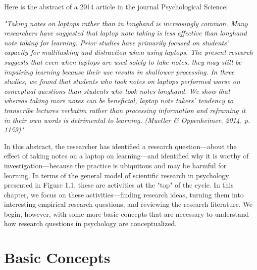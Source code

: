

Here is the abstract of a 2014 article in the journal Psychological Science:

\emph{"Taking notes on laptops rather than in longhand is increasingly common. Many researchers have suggested that laptop note taking is less effective than longhand note taking for learning. Prior studies have primarily focused on students' capacity for multitasking and distraction when using laptops. The present research suggests that even when laptops are used solely to take notes, they may still be impairing learning because their use results in shallower processing. In three studies, we found that students who took notes on laptops performed worse on conceptual questions than students who took notes longhand. We show that whereas taking more notes can be beneficial, laptop note takers' tendency to transcribe lectures verbatim rather than processing information and reframing it in their own words is detrimental to learning. (Mueller \& Oppenheimer, 2014, p. 1159)"}

In this abstract, the researcher has identified a research question---about the effect of taking notes on a laptop on learning---and identified why it is worthy of investigation---because the practice is ubiquitous and may be harmful for learning. In terms of the general model of scientific research in psychology presented in Figure 1.1, these are activities at the "top" of the cycle. In this chapter, we focus on these activities---finding research ideas, turning them into interesting empirical research questions, and reviewing the research literature. We begin, however, with some more basic concepts that are necessary to understand how research questions in psychology are conceptualized.

\section{Basic Concepts}

